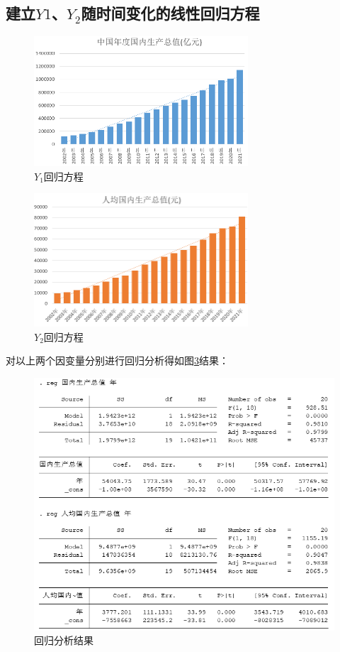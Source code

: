 \documentclass[UTF8]{article}
\begin{document}
	\subsection{建立$Y1$、$Y_2$随时间变化的线性回归方程}
	\begin{figure}[htb]
		\centering
		\includegraphics[width=8cm]{pictures/nhgdp.png}
		\caption{$Y_1$回归方程}
		\label{nhgdp}
	\end{figure}
	\begin{figure}[htb]
		\centering
		\includegraphics[width=8cm]{pictures/nhrjgdp.png}
		\caption{$Y_2$回归方程}
		\label{nhrjgdp}
	\end{figure}
	对以上两个因变量分别进行回归分析得如图\ref{nhjg7}结果：
	\newpage
	\begin{figure}[htb]
	\centering
	\includegraphics[width=12cm]{pictures/nhjg7.png}
	\caption{回归分析结果}
	\label{nhjg7}
	\end{figure}
\end{document}
